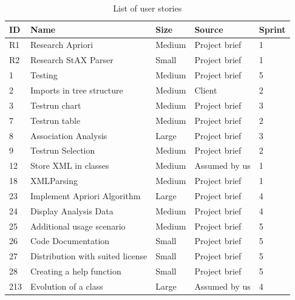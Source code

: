 
\begin{table}[!h]
  \caption{List of user stories}
  \centering
  \begin{tabular}{l||l|l|l|l|}
    ID & Name & Size &  Source & Sprint\\
    \hline
    R1&Research Apriori&Medium&Project brief&1\\
    R2&Research StAX Parser&Small&Project brief&1\\
    1&Testing&Medium&Project brief&5\\
    2&Imports in tree structure&Medium&Client&2\\ %
    3&Testrun chart&Medium&Project brief&3\\
    7&Testrun table&Medium&Project brief&2\\
    8&Association Analysis&Large&Project brief&3\\
    9&Testrun Selection&Medium&Project brief&2\\
    12&Store XML in classes&Medium&Assumed by us&1\\ 
    18&XMLParsing&Medium&Project brief&1\\
    23&Implement Apriori Algorithm&Large&Project brief&4\\
    24&Display Analysis Data&Medium&Project brief&4\\
    25&Additional usage scenario&Medium&Project brief&5\\
    26&Code Documentation&Small&Project brief&5\\
    27&Distribution with suited license&Small&Project brief&5\\ %
    28&Creating a help function&Small&Project brief&5\\
    213&Evolution of a class&Large&Assumed by us&4\\ 
  
	\end{tabular}
  \label{tab:user_stories}
\end{table}

